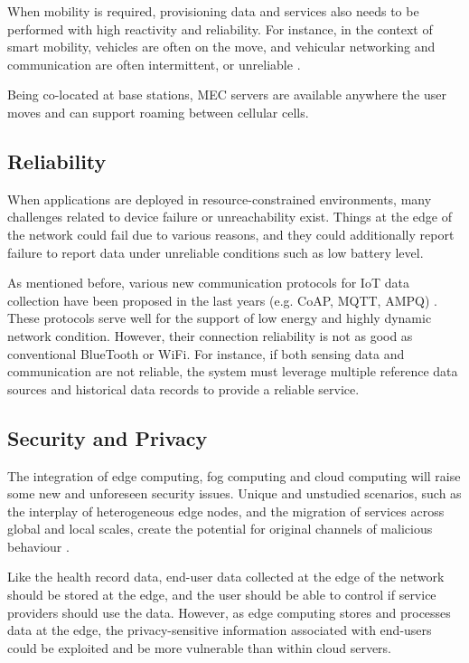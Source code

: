 When mobility is required, provisioning data and services also needs to be performed with high reactivity and reliability. For instance, in the context of smart mobility, vehicles are often on the move, and vehicular networking and communication are often intermittent, or unreliable \cite{vehicular-data-cloud}.

Being co-located at base stations, MEC servers are available anywhere the user moves and can support roaming between cellular cells.

\subsection{Reliability}

When applications are deployed in resource-constrained environments, many challenges related to device failure or unreachability exist. Things at the edge of the network could fail due to various reasons, and they could additionally report failure to report data under unreliable conditions such as low battery level.

As mentioned before, various new communication protocols for IoT data collection have been proposed in the last years (e.g. CoAP, MQTT, AMPQ) \cite{mqtt-coap-amqp-http}. These protocols serve well for the support of low energy and highly dynamic network condition. However, their connection reliability is not as good as conventional BlueTooth or WiFi. For instance, if both sensing data and communication are not reliable, the system must leverage multiple reference data sources and historical data records to provide a reliable service.

\subsection{Security and Privacy}

The integration of edge computing, fog computing and cloud computing will raise some new and unforeseen security issues. Unique and unstudied scenarios, such as the interplay of heterogeneous edge nodes, and the migration of services across global and local scales, create the potential for original channels of malicious behaviour \cite{edge-computing-survey}.

Like the health record data, end-user data collected at the edge of the network should be stored at the edge, and the user should be able to control if service providers should use the data. However, as edge computing stores and processes data at the edge, the privacy-sensitive information associated with end-users could be exploited and be more vulnerable than within cloud servers.

